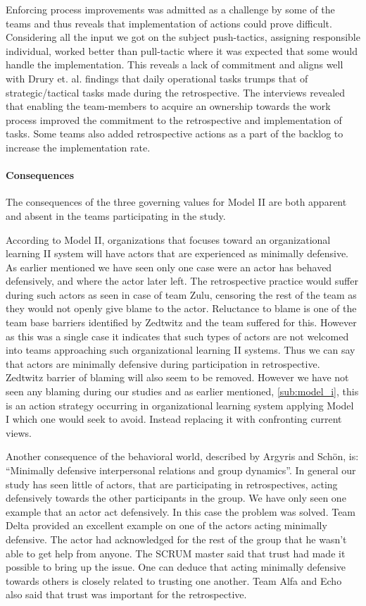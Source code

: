 Enforcing process improvements was admitted as a challenge by some of the teams and thus reveals that implementation of actions could prove difficult. Considering all the input we got on the subject push-tactics, assigning responsible individual, worked better than pull-tactic where it was expected that some would handle the implementation. This reveals a lack of commitment and aligns well with Drury et. al. \cite{Drury2012} findings that daily operational tasks trumps that of strategic/tactical tasks made during the retrospective. The interviews revealed that enabling the team-members to acquire an ownership towards the work process improved the commitment to the retrospective and implementation of tasks. Some teams also added retrospective actions as a part of the backlog to increase the implementation rate. 

\paragraph{Consequences}
The consequences of the three governing values for Model II are both apparent and absent in the teams participating in the study.

According to Model II, organizations that focuses toward an organizational learning II system will have actors that are experienced as minimally defensive. As earlier mentioned we have seen only one case were an actor has behaved defensively, and where the actor later left. The retrospective practice would suffer during such actors as seen in case of team Zulu, censoring the rest of the team as they would not openly give blame to the actor. Reluctance to blame is one of the team base barriers identified by Zedtwitz\cite{Zedtwitz2002} and the team suffered for this. However as this was a single case it indicates that such types of actors are not welcomed into teams approaching such organizational learning II systems. Thus we can say that actors are minimally defensive during participation in retrospective. Zedtwitz barrier of blaming will also seem to be removed. However we have not seen any blaming during our studies and as earlier mentioned, \autoref{sub:model_i}, this is an action strategy occurring in organizational learning system applying Model I which one would seek to avoid. Instead replacing it with confronting current views. 

Another consequence of the behavioral world, described by Argyris and Schön, is: ``Minimally defensive interpersonal relations and group dynamics''. In general our study has seen little of actors, that are participating in retrospectives, acting defensively towards the other participants in the group. We have only seen one example that an actor act defensively. In this case the problem was solved. Team Delta provided an excellent example on one of the actors acting minimally defensive. The actor had acknowledged for the rest of the group that he wasn't able to get help from anyone. The SCRUM master said that trust had made it possible to bring up the issue. One can deduce that acting minimally defensive towards others is closely related to trusting one another. Team Alfa and Echo also said that trust was important for the retrospective. 

